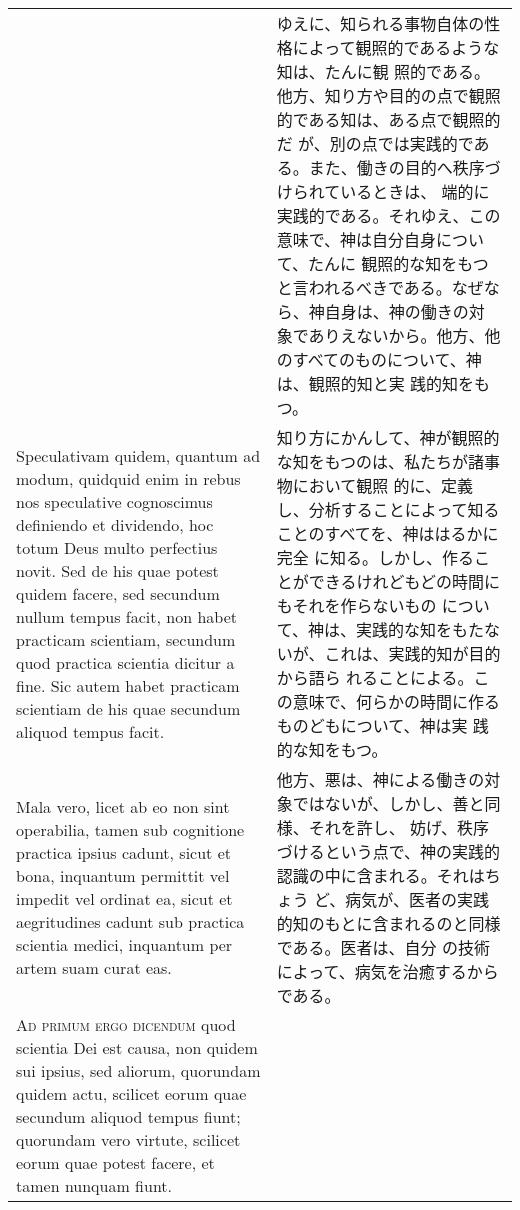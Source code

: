 \documentclass[10pt]{jsarticle} %
\begin{document}
\begin{longtable}{p{21em}p{21em}}
&

ゆえに、知られる事物自体の性格によって観照的であるような知は、たんに観
照的である。他方、知り方や目的の点で観照的である知は、ある点で観照的だ
が、別の点では実践的である。また、働きの目的へ秩序づけられているときは、
端的に実践的である。それゆえ、この意味で、神は自分自身について、たんに
観照的な知をもつと言われるべきである。なぜなら、神自身は、神の働きの対
象でありえないから。他方、他のすべてのものについて、神は、観照的知と実
践的知をもつ。


\\


Speculativam quidem, quantum ad modum,
quidquid enim in rebus nos speculative cognoscimus definiendo et
dividendo, hoc totum Deus multo perfectius novit. Sed de his quae potest
quidem facere, sed secundum nullum tempus facit, non habet practicam
scientiam, secundum quod practica scientia dicitur a fine. Sic autem
habet practicam scientiam de his quae secundum aliquod tempus
facit. 


&

知り方にかんして、神が観照的な知をもつのは、私たちが諸事物において観照
的に、定義し、分析することによって知ることのすべてを、神ははるかに完全
に知る。しかし、作ることができるけれどもどの時間にもそれを作らないもの
について、神は、実践的な知をもたないが、これは、実践的知が目的から語ら
れることによる。この意味で、何らかの時間に作るものどもについて、神は実
践的な知をもつ。

\\


Mala vero, licet ab eo non sint operabilia, tamen sub cognitione
practica ipsius cadunt, sicut et bona, inquantum permittit vel impedit
vel ordinat ea, sicut et aegritudines cadunt sub practica scientia
medici, inquantum per artem suam curat eas.

&

他方、悪は、神による働きの対象ではないが、しかし、善と同様、それを許し、
妨げ、秩序づけるという点で、神の実践的認識の中に含まれる。それはちょう
ど、病気が、医者の実践的知のもとに含まれるのと同様である。医者は、自分
の技術によって、病気を治癒するからである。

\\


{\scshape Ad primum ergo dicendum} quod scientia Dei
est causa, non quidem sui ipsius, sed aliorum, quorundam quidem actu,
scilicet eorum quae secundum aliquod tempus fiunt; quorundam vero
virtute, scilicet eorum quae potest facere, et tamen nunquam fiunt.

&


\end{longtable}
\end{document}
